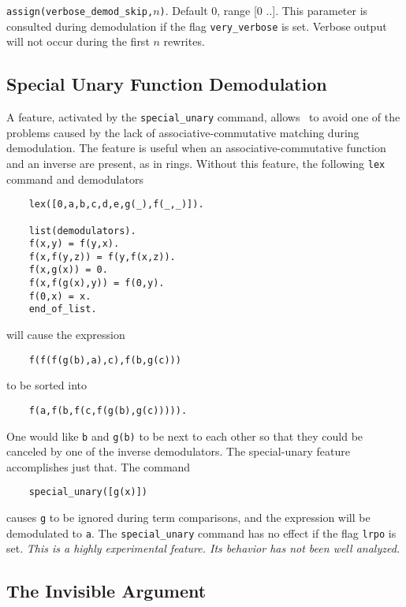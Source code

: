 \documentclass[11pt]{article}
\begin{document}
\noindent
\verb:assign(verbose_demod_skip,:$n$\verb:):.  Default 0, range [0 ..\maxint ].
This parameter is consulted during demodulation if the flag
\verb:very_verbose: is set.
Verbose output will not occur during the first $n$ rewrites.

\subsection{Special Unary Function Demodulation}

A feature, activated by the \verb:special_unary: command,
allows \otter\ to avoid one of the problems caused by
the lack of associative-commutative matching during demodulation.
The feature is useful when an associative-commutative function and
an inverse are present, as in rings.
Without this feature, the following \verb:lex: command and
demodulators

{\small
\begin{verbatim}
    lex([0,a,b,c,d,e,g(_),f(_,_)]).

    list(demodulators).
    f(x,y) = f(y,x).
    f(x,f(y,z)) = f(y,f(x,z)).
    f(x,g(x)) = 0.
    f(x,f(g(x),y)) = f(0,y).
    f(0,x) = x.
    end_of_list.
\end{verbatim}
}
\noindent
will cause the expression

{\small
\begin{verbatim}
    f(f(f(g(b),a),c),f(b,g(c)))
\end{verbatim}
}
\noindent
to be sorted into

{\small
\begin{verbatim}
    f(a,f(b,f(c,f(g(b),g(c))))).
\end{verbatim}
}
\noindent
One would like \verb:b: and \verb:g(b): to be next to each other so that
they could be canceled by one of the inverse demodulators.
The special-unary feature accomplishes just that.  The command

{\small
\begin{verbatim}
    special_unary([g(x)])
\end{verbatim}
}
\noindent
causes \verb:g: to be ignored during term comparisons, and the
expression will be demodulated to \verb:a:.
The \verb:special_unary: command has no effect if the flag
\verb:lrpo: is set.
{\it This is a highly experimental feature.  Its behavior has not
been well analyzed.}

\subsection{The Invisible Argument}
\end{document}

